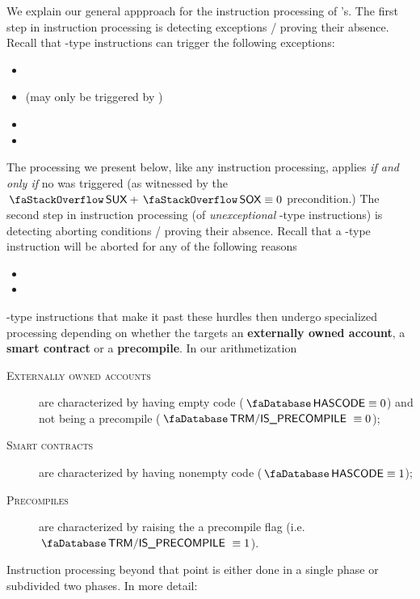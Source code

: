 We explain our general appproach for the instruction processing of 's.
The first step in instruction processing is detecting exceptions / proving their absence.
Recall that -type instructions can trigger the following exceptions:
\begin{itemize}
	\item \suxSH{}
	\item \staticxSH{} (may only be triggered by )
	\item \mxpxSH{}
	\item \oogxSH{}
\end{itemize}
The processing we present below, like any instruction processing, applies \emph{if and only if} no \suxSH{} was triggered (as witnessed by the $\stackSux + \stackSox \equiv 0$ precondition.)
The second step in instruction processing (of \emph{unexceptional} -type instructions) is detecting aborting conditions / proving their absence.
Recall that a -type instruction will be aborted for any of the following reasons
\begin{itemize}
	\item \balAbortSH{}
	\item \csdAbortSH{}
\end{itemize}
-type instructions that make it past these hurdles then undergo specialized processing depending on whether the  targets an \textbf{externally owned account}, a \textbf{smart contract} or a \textbf{precompile}.
In our arithmetization
\begin{description}
	\item[\textsc{Externally owned accounts}]
		are characterized by having empty code ($\accHasCode \equiv 0$) and not being a precompile ($\accTrmIsPrecompile \equiv 0$);
	\item[\textsc{Smart contracts}]
		are characterized by having nonempty code ($\accHasCode \equiv 1$);
	\item[\textsc{Precompiles}]
		are characterized by raising the a precompile flag (i.e. $\accTrmIsPrecompile \equiv 1$).
\end{description}
Instruction processing beyond that point is either done in a single phase or subdivided two phases.
In more detail:
